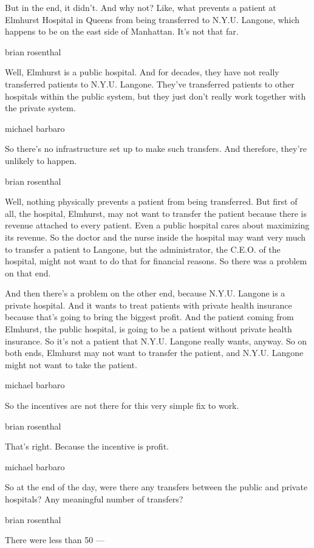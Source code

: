 But in the end, it didn't. And why not? Like, what prevents a patient at
Elmhurst Hospital in Queens from being transferred to N.Y.U. Langone,
which happens to be on the east side of Manhattan. It's not that far.

brian rosenthal

Well, Elmhurst is a public hospital. And for decades, they have not
really transferred patients to N.Y.U. Langone. They've transferred
patients to other hospitals within the public system, but they just
don't really work together with the private system.

michael barbaro

So there's no infrastructure set up to make such transfers. And
therefore, they're unlikely to happen.

brian rosenthal

Well, nothing physically prevents a patient from being transferred. But
first of all, the hospital, Elmhurst, may not want to transfer the
patient because there is revenue attached to every patient. Even a
public hospital cares about maximizing its revenue. So the doctor and
the nurse inside the hospital may want very much to transfer a patient
to Langone, but the administrator, the C.E.O. of the hospital, might not
want to do that for financial reasons. So there was a problem on that
end.

And then there's a problem on the other end, because N.Y.U. Langone is a
private hospital. And it wants to treat patients with private health
insurance because that's going to bring the biggest profit. And the
patient coming from Elmhurst, the public hospital, is going to be a
patient without private health insurance. So it's not a patient that
N.Y.U. Langone really wants, anyway. So on both ends, Elmhurst may not
want to transfer the patient, and N.Y.U. Langone might not want to take
the patient.

michael barbaro

So the incentives are not there for this very simple fix to work.

brian rosenthal

That's right. Because the incentive is profit.

michael barbaro

So at the end of the day, were there any transfers between the public
and private hospitals? Any meaningful number of transfers?

brian rosenthal

There were less than 50 ---

